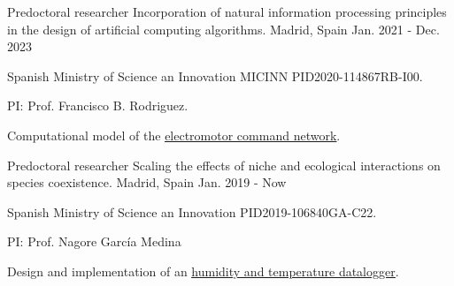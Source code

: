 

\begin{cventries}

  \cventry
    {Predoctoral researcher} %
    {Incorporation of natural information processing principles in the design of artificial computing algorithms.} %
    {Madrid, Spain} %
    {Jan. 2021 - Dec. 2023} %
    {
      \begin{cvitems} %
        \item {Spanish Ministry of Science an Innovation MICINN PID2020-114867RB-I00.}
        \item {PI: Prof. Francisco B. Rodriguez.}
        \item {Computational model of the \underline{\href{https://github.com/GNB-UAM/electromotor-nmodel}{electromotor command network}}.}
      \end{cvitems}
    }

  \cventry
    {Predoctoral researcher} %
    {Scaling the effects of niche and ecological interactions on species coexistence. } %
    {Madrid, Spain} %
    {Jan. 2019 - Now} %
    {
      \begin{cvitems} %
        \item {Spanish Ministry of Science an Innovation PID2019-106840GA-C22.}
        \item {PI: Prof. Nagore García Medina}
        \item {Design and implementation of an \underline{\href{https://github.com/united-ecology/btmboard}{humidity and temperature datalogger}}.}
      \end{cvitems}
    }


\end{cventries}
